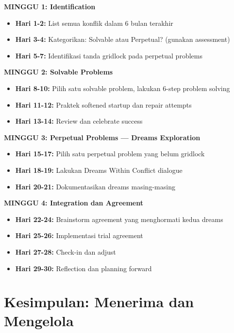 \begin{exercisebox}

\textbf{MINGGU 1: Identification}
\begin{itemize}
    \item \textbf{Hari 1-2:} List semua konflik dalam 6 bulan terakhir
    \item \textbf{Hari 3-4:} Kategorikan: Solvable atau Perpetual? (gunakan assessment)
    \item \textbf{Hari 5-7:} Identifikasi tanda gridlock pada perpetual problems
\end{itemize}

\textbf{MINGGU 2: Solvable Problems}
\begin{itemize}
    \item \textbf{Hari 8-10:} Pilih satu solvable problem, lakukan 6-step problem solving
    \item \textbf{Hari 11-12:} Praktek softened startup dan repair attempts
    \item \textbf{Hari 13-14:} Review dan celebrate success
\end{itemize}

\textbf{MINGGU 3: Perpetual Problems --- Dreams Exploration}
\begin{itemize}
    \item \textbf{Hari 15-17:} Pilih satu perpetual problem yang belum gridlock
    \item \textbf{Hari 18-19:} Lakukan Dreams Within Conflict dialogue
    \item \textbf{Hari 20-21:} Dokumentasikan dreams masing-masing
\end{itemize}

\textbf{MINGGU 4: Integration dan Agreement}
\begin{itemize}
    \item \textbf{Hari 22-24:} Brainstorm agreement yang menghormati kedua dreams
    \item \textbf{Hari 25-26:} Implementasi trial agreement
    \item \textbf{Hari 27-28:} Check-in dan adjust
    \item \textbf{Hari 29-30:} Reflection dan planning forward
\end{itemize}
\end{exercisebox}

\section{Kesimpulan: Menerima dan Mengelola}

